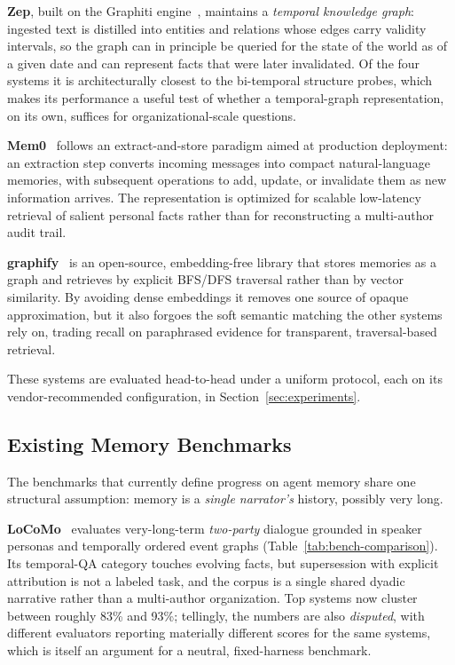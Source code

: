 \textbf{Zep}, built on the Graphiti engine~\citep{zep_graphiti_2025}, maintains a
\emph{temporal knowledge graph}: ingested text is distilled into entities and
relations whose edges carry validity intervals, so the graph can in principle be
queried for the state of the world as of a given date and can represent facts that
were later invalidated. Of the four systems it is architecturally closest to the
bi-temporal structure \bench{} probes, which makes its performance a useful test
of whether a temporal-graph representation, on its own, suffices for
organizational-scale questions.

\textbf{Mem0}~\citep{mem0_2024} follows an extract-and-store paradigm aimed at
production deployment: an extraction step converts incoming messages into compact
natural-language memories, with subsequent operations to add, update, or
invalidate them as new information arrives. The representation is optimized for
scalable low-latency retrieval of salient personal facts rather than for
reconstructing a multi-author audit trail.

\textbf{graphify}~\citep{graphify_oss} is an open-source, embedding-free library
that stores memories as a graph and retrieves by explicit BFS/DFS traversal rather
than by vector similarity. By avoiding dense embeddings it removes one source of
opaque approximation, but it also forgoes the soft semantic matching the other
systems rely on, trading recall on paraphrased evidence for transparent, traversal-based
retrieval.

{\sloppy These systems are evaluated head-to-head under a uniform protocol, each
on its vendor-recommended configuration, in Section~\ref{sec:experiments}.\par}

\subsection{Existing Memory Benchmarks}
\label{sec:related:benchmarks}

The benchmarks that currently define progress on agent memory share one structural
assumption: memory is a \emph{single narrator's} history, possibly very long.

\textbf{LoCoMo}~\citep{maharana2024locomo} evaluates very-long-term \emph{two-party}
dialogue grounded in speaker personas and temporally ordered event graphs
(Table~\ref{tab:bench-comparison}). Its temporal-QA category touches evolving facts,
but supersession with explicit attribution is not a labeled task, and the corpus is
a single shared dyadic narrative rather than a multi-author organization. Top
systems now cluster between roughly 83\% and 93\%; tellingly, the numbers are also
\emph{disputed}, with different evaluators reporting materially different scores for
the same systems, which is itself an argument for a neutral, fixed-harness
benchmark.

